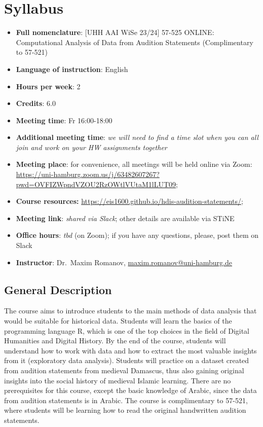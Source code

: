 \documentclass[
]{book}
\providecommand{\tightlist}{%
  \setlength{\itemsep}{0pt}\setlength{\parskip}{0pt}}
\begin{document}
\hypertarget{syllabus}{%
\section*{Syllabus}\label{syllabus}}

\begin{itemize}
\tightlist
\item
  \textbf{Full nomenclature}: {[}UHH AAI WiSe 23/24{]} 57-525 ONLINE: Computational Analysis of Data from Audition Statements (Complimentary to 57-521)
\item
  \textbf{Language of instruction}: English
\item
  \textbf{Hours per week}: 2
\item
  \textbf{Credits}: 6.0
\item
  \textbf{Meeting time}: Fr 16:00-18:00
\item
  \textbf{Additional meeting time}: \emph{we will need to find a time slot when you can all join and work on your HW assignments together}
\item
  \textbf{Meeting place}: for convenience, all meetings will be held online via Zoom: \url{https://uni-hamburg.zoom.us/j/63482607267?pwd=OVFIZWpndVZOU2RzOWtlVUtaM1lLUT09};
\item
  \textbf{Course resources:} \url{https://eis1600.github.io/hdis-audition-statements/};
\item
  \textbf{Meeting link}: \emph{shared via Slack}; other details are available via STiNE
\item
  \textbf{Office hours}: \emph{tbd} (on Zoom); if you have any questions, please, post them on Slack
\item
  \textbf{Instructor}: Dr.~Maxim Romanov, \url{maxim.romanov@uni-hamburg.de}
\end{itemize}

\hypertarget{general-description}{%
\subsection*{General Description}\label{general-description}}

The course aims to introduce students to the main methods of data analysis that would be suitable for historical data. Students will learn the basics of the programming language R, which is one of the top choices in the field of Digital Humanities and Digital History. By the end of the course, students will understand how to work with data and how to extract the most valuable insights from it (exploratory data analysis). Students will practice on a dataset created from audition statements from medieval Damascus, thus also gaining original insights into the social history of medieval Islamic learning. There are no prerequisites for this course, except the basic knowledge of Arabic, since the data from audition statements is in Arabic. The course is complimentary to 57-521, where students will be learning how to read the original handwritten audition statements.
\end{document}
